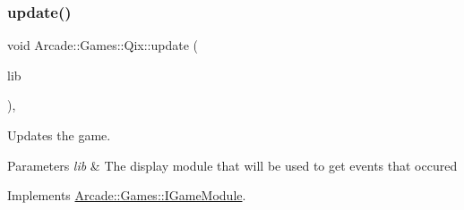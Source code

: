 \subsubsection{\texorpdfstring{update()}{update()}}
{\footnotesize\ttfamily void Arcade\+::\+Games\+::\+Qix\+::update (\begin{DoxyParamCaption}\item[{const \mbox{\hyperlink{classArcade_1_1Display_1_1IDisplayModule}{Arcade\+::\+Display\+::\+I\+Display\+Module}} \&}]{lib }\end{DoxyParamCaption})\hspace{0.3cm}{\ttfamily [final]}, {\ttfamily [virtual]}}



Updates the game. 


\begin{DoxyParams}{Parameters}
{\em lib} & The display module that will be used to get events that occured \\
\hline
\end{DoxyParams}


Implements \mbox{\hyperlink{classArcade_1_1Games_1_1IGameModule_a421d1064fcc112dfc7ea025fc7f88aa7}{Arcade\+::\+Games\+::\+I\+Game\+Module}}.

